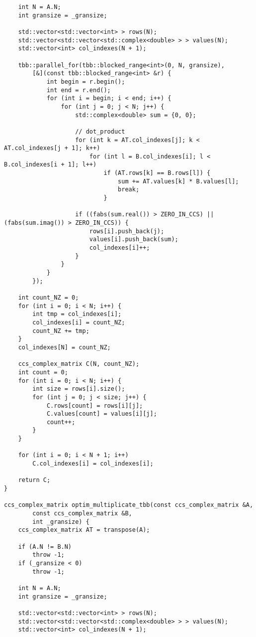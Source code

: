\documentclass{report}
\begin{document}
\begin{lstlisting}
    int N = A.N;
    int gransize = _gransize;

    std::vector<std::vector<int> > rows(N);
    std::vector<std::vector<std::complex<double> > > values(N);
    std::vector<int> col_indexes(N + 1);

    tbb::parallel_for(tbb::blocked_range<int>(0, N, gransize),
        [&](const tbb::blocked_range<int> &r) {
            int begin = r.begin();
            int end = r.end();
            for (int i = begin; i < end; i++) {
                for (int j = 0; j < N; j++) {
                    std::complex<double> sum = {0, 0};

                    // dot_product
                    for (int k = AT.col_indexes[j]; k < AT.col_indexes[j + 1]; k++)
                        for (int l = B.col_indexes[i]; l < B.col_indexes[i + 1]; l++)
                            if (AT.rows[k] == B.rows[l]) {
                                sum += AT.values[k] * B.values[l];
                                break;
                            }

                    if ((fabs(sum.real()) > ZERO_IN_CCS) || (fabs(sum.imag()) > ZERO_IN_CCS)) {
                        rows[i].push_back(j);
                        values[i].push_back(sum);
                        col_indexes[i]++;
                    }
                }
            }
        });

    int count_NZ = 0;
    for (int i = 0; i < N; i++) {
        int tmp = col_indexes[i];
        col_indexes[i] = count_NZ;
        count_NZ += tmp;
    }
    col_indexes[N] = count_NZ;

    ccs_complex_matrix C(N, count_NZ);
    int count = 0;
    for (int i = 0; i < N; i++) {
        int size = rows[i].size();
        for (int j = 0; j < size; j++) {
            C.rows[count] = rows[i][j];
            C.values[count] = values[i][j];
            count++;
        }
    }

    for (int i = 0; i < N + 1; i++)
        C.col_indexes[i] = col_indexes[i];

    return C;
}

ccs_complex_matrix optim_multiplicate_tbb(const ccs_complex_matrix &A,
        const ccs_complex_matrix &B,
        int _gransize) {
    ccs_complex_matrix AT = transpose(A);

    if (A.N != B.N)
        throw -1;
    if (_gransize < 0)
        throw -1;

    int N = A.N;
    int gransize = _gransize;

    std::vector<std::vector<int> > rows(N);
    std::vector<std::vector<std::complex<double> > > values(N);
    std::vector<int> col_indexes(N + 1);


\end{lstlisting}
\end{document}
